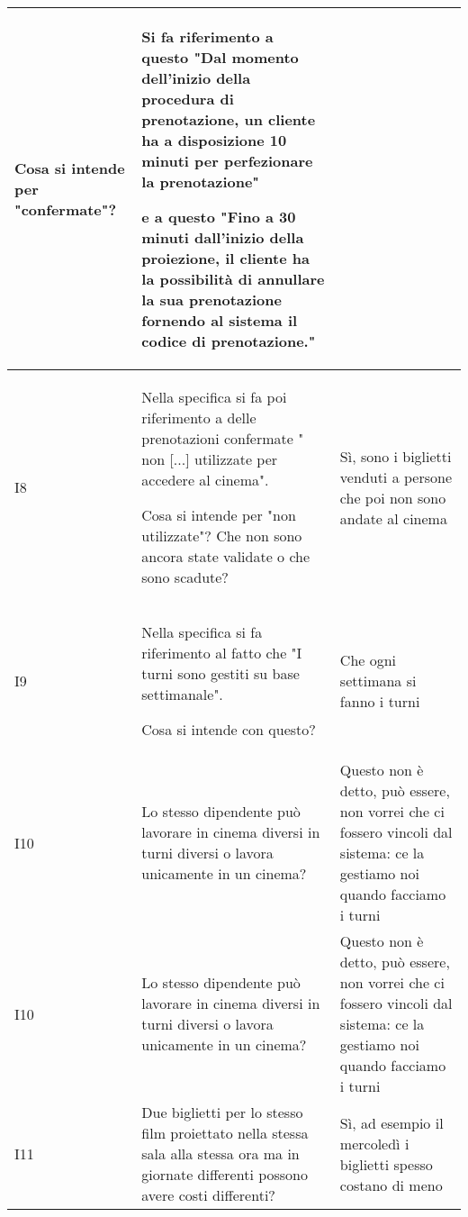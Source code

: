 \begin{longtable}{|p{1cm}|p{7.66cm}|p{7.66cm}|}
      Cosa si intende per "confermate"?                                       &
      Si fa riferimento a questo
      "Dal momento dell’inizio della procedura di prenotazione, un cliente ha
      a disposizione 10 minuti per perfezionare la prenotazione"

      e a questo "Fino a 30 minuti dall'inizio della proiezione, il cliente ha
      la possibilità di annullare la sua prenotazione fornendo al sistema il
      codice di prenotazione."
      \\\hline
      I8                                                                      &
      Nella specifica si fa poi riferimento a delle
      prenotazioni confermate " non  [...] utilizzate per accedere al cinema".

      Cosa si intende per "non utilizzate"? Che non sono ancora state
      validate o che sono scadute?                                            &
      Sì, sono i biglietti venduti a persone che poi non sono andate al cinema
      \\\hline
      I9                                                                      &
      Nella specifica si fa riferimento al fatto che
      "I turni sono gestiti su base settimanale".

      Cosa si intende con questo?                                             &
      Che ogni settimana si fanno i turni
      \\\hline
      I10                                                                     &
      Lo stesso dipendente può lavorare in cinema diversi in turni diversi o
      lavora unicamente in un cinema?                                         &
      Questo non è detto, può essere, non vorrei che ci fossero vincoli dal
      sistema: ce la gestiamo noi quando facciamo i turni
      \\\hline
      I10                                                                     &
      Lo stesso dipendente può lavorare in cinema diversi in turni diversi o
      lavora unicamente in un cinema?                                         &
      Questo non è detto, può essere, non vorrei che ci fossero vincoli dal
      sistema: ce la gestiamo noi quando facciamo i turni
      \\\hline
      I11                                                                     &
      Due biglietti per lo stesso film proiettato nella stessa sala alla
      stessa ora ma in giornate differenti possono avere costi differenti?    &
      Sì, ad esempio il mercoledì i biglietti spesso costano di meno
      \\\hline
\end{longtable}

